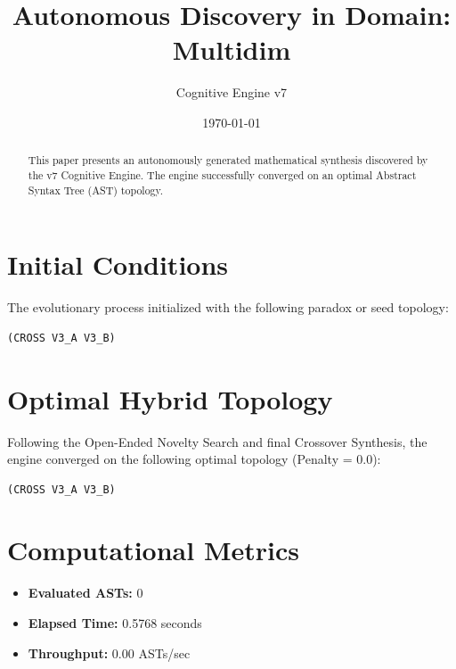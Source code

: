 \documentclass{article}
\title{Autonomous Discovery in Domain: Multidim}
\author{Cognitive Engine v7}
\date{\today}
\begin{document}
\maketitle
\begin{abstract}
This paper presents an autonomously generated mathematical synthesis discovered by the v7 Cognitive Engine. The engine successfully converged on an optimal Abstract Syntax Tree (AST) topology.\end{abstract}
\section{Initial Conditions}
The evolutionary process initialized with the following paradox or seed topology:
\begin{verbatim}
(CROSS V3_A V3_B)
\end{verbatim}
\section{Optimal Hybrid Topology}
Following the Open-Ended Novelty Search and final Crossover Synthesis, the engine converged on the following optimal topology (Penalty = 0.0):
\begin{verbatim}
(CROSS V3_A V3_B)
\end{verbatim}
\section{Computational Metrics}
\begin{itemize}
  \item \textbf{Evaluated ASTs:} 0
  \item \textbf{Elapsed Time:} 0.5768 seconds
  \item \textbf{Throughput:} 0.00 ASTs/sec
\end{itemize}
\end{document}
